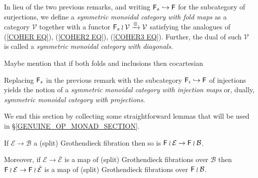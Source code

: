 \documentclass[a4paper,10pt]{article}%
\begin{document}


\begin{remark}\label{FINSURJ REM}
	In lieu of the two previous remarks,
	and writing $\mathsf{F}_s \hookrightarrow \mathsf{F}$ 
	for the subcategory of surjections,
	we define a 
	\textit{symmetric monoidal category with fold maps}
	as a category $\mathcal{V}$ together with a functor
	$\mathsf{F}_s \wr \mathcal{V} \xrightarrow{\otimes} \mathcal{V}$
	satisfying the analogues of  
	(\ref{COHER EQ}), (\ref{COHER2 EQ}), (\ref{COHER3 EQ}).
	Further, the dual of such $\mathcal{V}$ is called a 
	\textit{symmetric monoidal category with diagonals}.
\end{remark}

{\color{red} Maybe mention that if both folds and inclusions then cocartesian}

\begin{remark}
Replacing $\mathsf{F}_s$ in the previous remark with the subcategory
$\mathsf{F}_i \hookrightarrow \mathsf{F}$ of injections yields the notion of a \textit{symmetric monoidal category with injection maps} or, dually, \textit{symmetric monoidal category with projections}.
\end{remark}


We end this section by collecting some straightforward lemmas
that will be used in \S \ref{GENUINE_OP_MONAD_SECTION}.

\begin{lemma}\label{FWRGROTH LEM}
	If $\mathcal{E} \to \mathcal{B}$ a (split) Grothendieck fibration then so is 
	$\mathsf{F} \wr \mathcal{E} \to \mathsf{F} \wr \mathcal{B}$.

	Moreover, if 
	$\mathcal{E} \to \bar{\mathcal{E}}$ is a map of (split) Grothendieck fibrations over $\mathcal{B}$ then
	$\mathsf{F} \wr \mathcal{E} \to \mathsf{F} \wr \bar{\mathcal{E}}$ is a map of (split) Grothendieck fibrations over $\mathsf{F} \wr \mathcal{B}$.
\end{lemma}
\end{document}
